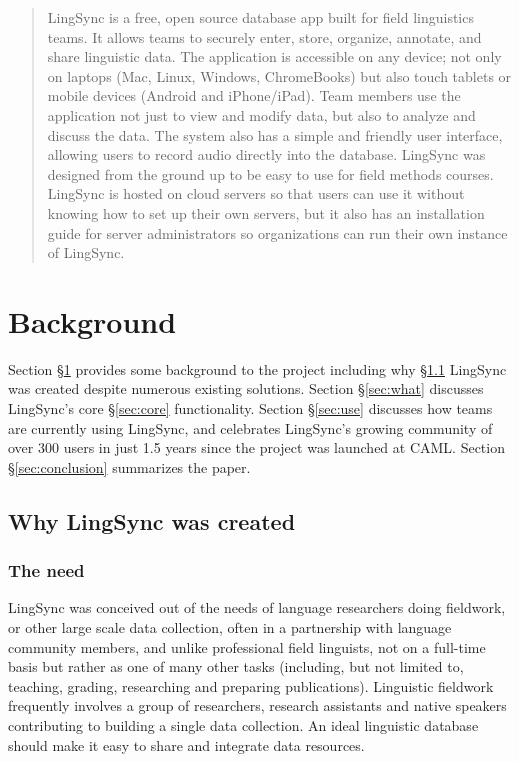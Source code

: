 \documentclass[letterpaper, 12pt, dvips]{mitwpl}
\begin{document}
\renewcommand*\abstractname{Abstract}

\begin{abstract} 
LingSync is a free,
open source database app built for field linguistics teams.
It allows teams to securely enter,
store,
organize,
annotate,
and share linguistic data.
The application is accessible on any device; 
not only on laptops (Mac,
Linux,
Windows,
ChromeBooks) but also touch tablets or mobile devices (Android and iPhone/iPad).
 Team members use the application not just to view and modify data,
but also to analyze and discuss the data.
The system also has a simple and friendly user interface,
allowing users to record audio directly into the database.
LingSync was designed from the ground up to be easy to use for field methods courses.
LingSync is hosted on cloud servers so that users can use it without knowing how to set up their own servers,
but it also has an installation guide for server administrators so organizations can run their own instance of LingSync. 
\end{abstract}


\section{Background}
\label{sec:background}
 Section \S \ref{sec:background} provides some background to the project including why \S \ref{sec:why} LingSync was created despite numerous existing solutions. 
Section \S \ref{sec:what} discusses LingSync's core \S \ref{sec:core} functionality. Section \S \ref{sec:use} discusses how teams are currently using LingSync, and celebrates LingSync's  growing community of over 300 users in just 1.5 years since the project was launched at CAML. Section \S \ref{sec:conclusion} summarizes  the paper.

\subsection{Why LingSync was created}
\label{sec:why}
\subsubsection{The need}

LingSync was conceived out of the needs of language researchers doing
fieldwork, or other large scale data collection, 
often in a partnership with language community members, 
and unlike professional field linguists, 
 not on a full-time basis but rather as one of many other tasks (including, but not limited to, teaching, grading, researching and preparing publications).
Linguistic fieldwork frequently  involves a group of researchers, research assistants and native speakers contributing to building a single data collection.
An ideal linguistic database should make it easy to share and integrate data resources.
\end{document}

